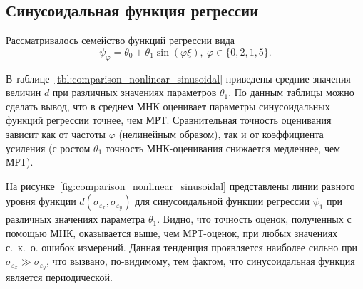 \vspace{2\baselineskip}
\subsection{Синусоидальная функция регрессии}

Рассматривалось семейство функций регрессии вида
\[ \psi_{\varphi} = \theta_0 + \theta_1 \sin{(\varphi \xi)}, \:
  \varphi \in \{ 0{,}2, 1, 5 \}. \]

В таблице~\ref{tbl:comparison_nonlinear_sinusoidal} приведены средние значения
величин \( d \) при различных значениях параметров \( \theta_1 \).
По данным таблицы можно сделать вывод, что в среднем МНК оценивает параметры
синусоидальных функций регрессии точнее, чем МРТ.
Сравнительная точность оценивания зависит как от частоты \( \varphi \)
(нелинейным образом), так и от коэффициента усиления
(с ростом \( \theta_1 \) точность МНК-оценивания снижается медленнее, чем МРТ).

На рисунке~\ref{fig:comparison_nonlinear_sinusoidal}
представлены линии равного уровня функции \( d(\sigma_{\varepsilon_x}, \sigma_{\varepsilon_y}) \)
для синусоидальной функции регрессии \( \psi_{1} \) при
различных значениях параметра \( \theta_1 \).
Видно, что точность оценок, полученных с помощью МНК, оказывается выше,
чем МРТ-оценок, при любых значениях с.~к.~о. ошибок измерений.
Данная тенденция проявляется наиболее сильно при
\( \sigma_{\varepsilon_x} \gg \sigma_{\varepsilon_y} \),
что вызвано, по-видимому, тем фактом, что синусоидальная функция
является периодической.

